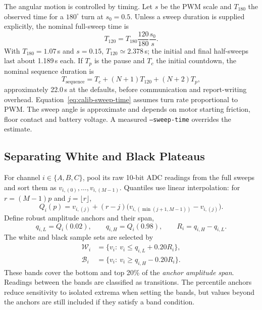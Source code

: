 The angular motion is controlled by timing. Let $s$ be the PWM scale and $T_{180}$ the observed time for a $180^\circ$ turn at $s_0=0.5$. Unless a sweep duration is supplied explicitly, the nominal full-sweep time is
\begin{equation}
T_{120}=T_{180}\frac{120}{180}\frac{s_0}{s}.
\label{eq:calib-sweep-time}
\end{equation}
With $T_{180}=1.07$\,s and $s=0.15$, $T_{120}\simeq2.378$\,s; the initial and final half-sweeps last about 1.189\,s each. If $T_p$ is the pause and $T_c$ the initial countdown, the nominal sequence duration is
\begin{equation}
T_{\mathrm{sequence}}=T_c+(N+1)T_{120}+(N+2)T_p,
\end{equation}
approximately 22.0\,s at the defaults, before communication and report-writing overhead. Equation~\eqref{eq:calib-sweep-time} assumes turn rate proportional to PWM. The sweep angle is approximate and depends on motor starting friction, floor contact and battery voltage. A measured \texttt{--sweep-time} overrides the estimate.

\subsection{Separating White and Black Plateaus}
For channel $i\in\{A,B,C\}$, pool its raw 10-bit ADC readings from the full sweeps and sort them as $v_{i,(0)},\ldots,v_{i,(M-1)}$. Quantiles use linear interpolation: for $r=(M-1)p$ and $j=\lfloor r\rfloor$,
\begin{equation}
Q_i(p)=v_{i,(j)}+(r-j)\bigl(v_{i,(\min(j+1,M-1))}-v_{i,(j)}\bigr).
\end{equation}
Define robust amplitude anchors and their span,
\begin{equation}
q_{i,L}=Q_i(0.02),\qquad q_{i,H}=Q_i(0.98),\qquad R_i=q_{i,H}-q_{i,L}.
\end{equation}
The white and black sample sets are selected by
\begin{align}
\mathcal W_i&=\{v_i:\ v_i\le q_{i,L}+0.20R_i\},\\
\mathcal B_i&=\{v_i:\ v_i\ge q_{i,H}-0.20R_i\}.
\end{align}
These bands cover the bottom and top 20\% of the \emph{anchor amplitude span}. Readings between the bands are classified as transitions. The percentile anchors reduce sensitivity to isolated extrema when setting the bands, but values beyond the anchors are still included if they satisfy a band condition.

